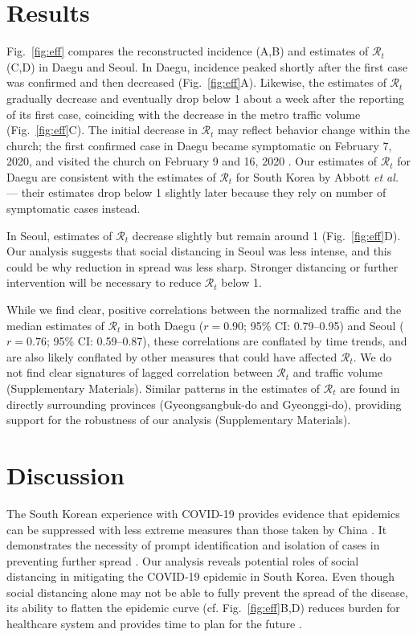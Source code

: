 \documentclass[12pt]{article}
\newcommand{\fref}[1]{Fig.~\ref{fig:#1}}
\begin{document}
\section{Results}

\fref{eff} compares the reconstructed incidence (A,B) and estimates of $\mathcal R_t$ (C,D) in Daegu and Seoul.
In Daegu, incidence peaked shortly after the first case was confirmed and then decreased (\fref{eff}A).
Likewise, the estimates of $\mathcal R_t$ gradually decrease and eventually drop below 1 about a week after the reporting of its first case, coinciding with the decrease in the metro traffic volume (\fref{eff}C).
The initial decrease in $\mathcal R_t$ may reflect behavior change within the church; the first confirmed case in Daegu became symptomatic on February 7, 2020, and visited the church on February 9 and 16, 2020 \citep{kcdc}.
Our estimates of $\mathcal R_t$ for Daegu are consistent with the estimates of $\mathcal R_t$ for South Korea by Abbott \textit{et al.} \cite{tempvar} --- their estimates drop below 1 slightly later because they rely on number of symptomatic cases instead.

In Seoul, estimates of $\mathcal R_t$ decrease slightly but remain around 1 (\fref{eff}D).
Our analysis suggests that social distancing in Seoul was less intense, and this could be why reduction in spread was less sharp.
Stronger distancing or further intervention will be necessary to reduce $\mathcal R_t$ below 1.

While we find clear, positive correlations between the normalized traffic and the median estimates of $\mathcal R_t$ in both Daegu ($r=0.90$; 95\% CI: 0.79--0.95) and Seoul ($r=0.76$; 95\% CI: 0.59--0.87), these correlations are conflated by time trends, and are also likely conflated by other measures that could have affected $\mathcal R_t$.
We do not find clear signatures of lagged correlation between $\mathcal R_t$ and traffic volume (Supplementary Materials).
Similar patterns in the estimates of $\mathcal R_t$ are found in directly surrounding provinces (Gyeongsangbuk-do and Gyeonggi-do), providing support for the robustness of our analysis (Supplementary Materials).

\section{Discussion}

The South Korean experience with COVID-19 provides evidence that epidemics can be suppressed with less extreme measures than those taken by China \citep{kickbusch2020response}.
It demonstrates the necessity of prompt identification and isolation of cases in preventing further spread \citep{fergusonimpact, tracingkorea, science}.
Our analysis reveals potential roles of social distancing in mitigating the COVID-19 epidemic in South Korea.
Even though social distancing alone may not be able to fully prevent the spread of the disease, its ability to flatten the epidemic curve (cf. \fref{eff}B,D) reduces burden for healthcare system and provides time to plan for the future \citep{anderson2020will}.
\end{document}
